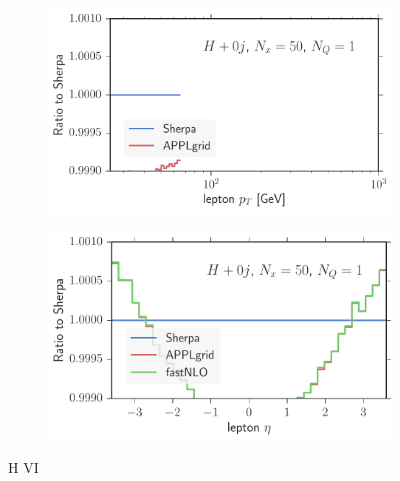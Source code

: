 \begin{figure}
\begin{subfigure}[]{0.49\textwidth}
	\includegraphics[width=\textwidth]{images/hvi_lpt.pdf}
\end{subfigure}
\begin{subfigure}[]{0.49\textwidth}
	\includegraphics[width=\textwidth]{images/hvi_leta.pdf}
\end{subfigure}
\caption{H VI}
\end{figure}
%
